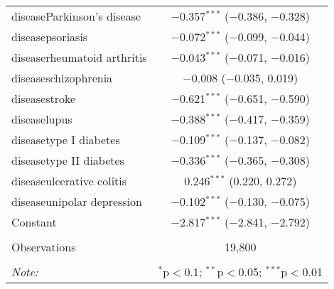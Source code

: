 \begin{table}[!htbp]
\begin{tabular}{@{\extracolsep{5pt}}lc}
  diseaseParkinson's disease & $-$0.357$^{***}$ ($-$0.386, $-$0.328) \\ 
  diseasepsoriasis & $-$0.072$^{***}$ ($-$0.099, $-$0.044) \\ 
  diseaserheumatoid arthritis & $-$0.043$^{***}$ ($-$0.071, $-$0.016) \\ 
  diseaseschizophrenia & $-$0.008 ($-$0.035, 0.019) \\ 
  diseasestroke & $-$0.621$^{***}$ ($-$0.651, $-$0.590) \\ 
  diseaselupus & $-$0.388$^{***}$ ($-$0.417, $-$0.359) \\ 
  diseasetype I diabetes & $-$0.109$^{***}$ ($-$0.137, $-$0.082) \\ 
  diseasetype II diabetes & $-$0.336$^{***}$ ($-$0.365, $-$0.308) \\ 
  diseaseulcerative colitis & 0.246$^{***}$ (0.220, 0.272) \\ 
  diseaseunipolar depression & $-$0.102$^{***}$ ($-$0.130, $-$0.075) \\ 
  Constant & $-$2.817$^{***}$ ($-$2.841, $-$2.792) \\ 
 \hline \\[-1.8ex] 
Observations & 19,800 \\ 
\hline 
\hline \\[-1.8ex] 
\textit{Note:}  & \multicolumn{1}{r}{$^{*}$p$<$0.1; $^{**}$p$<$0.05; $^{***}$p$<$0.01} \\ 
\end{tabular} 
\end{table} 
